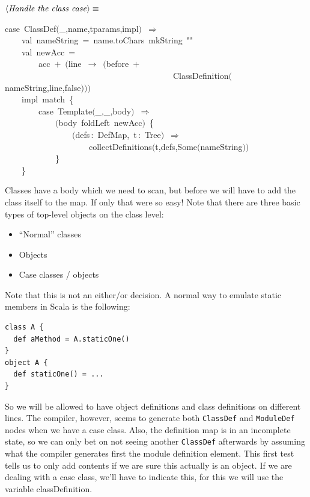 \documentclass[a4paper,12pt]{article}
\begin{document}
$\left<\mbox{\emph{Handle the class case}}\right>\equiv$
\begin{program}{\vem case}~ClassDef$($\_,name,tparams,impl$)$~$\Rightarrow$
\\~~~~{\vem val}~nameString~=~name.toChars~mkString~""
\\~~~~{\vem val}~newAcc~=
\\~~~~~~~~acc~$+$~$($line~$\rightarrow$~$($before~$+$
\\~~~~~~~~~~~~~~~~~~~~~~~~~~~~~~~~~~~~~~~~ClassDefinition$($nameString,line,{\vem false}$)$$)$$)$
\\~~~~impl~{\vem match}~{\small\{}
\\~~~~~~~~{\vem case}~Template$($\_,\_,body$)$~$\Rightarrow$
\\~~~~~~~~~~~~$($body~foldLeft~newAcc$)$~{\small\{}
\\~~~~~~~~~~~~~~~~$($defs\,{\rm :}~DefMap,~t\,{\rm :}~Tree$)$~$\Rightarrow$
\\~~~~~~~~~~~~~~~~~~~~collectDefinitions$($t,defs,Some$($nameString$)$$)$
\\~~~~~~~~~~~~{\small\}}
\\~~~~{\small\}}
\\[0.5em]\end{program}
Classes have a body which we need to scan, but before we will have to add the class
itself to the map. If only that were so easy! Note that there are three basic types
of top-level objects on the class level:

\begin{itemize}
\item ``Normal'' classes
\item Objects
\item Case classes / objects
\end{itemize}

Note that this is not an either/or decision. A normal way to emulate static members in
Scala is the following:

\begin{verbatim}
class A {
  def aMethod = A.staticOne()
}
object A {
  def staticOne() = ...
}
\end{verbatim}

So we will be allowed to have object definitions and class definitions on different
lines. The compiler, however, seems to generate both \texttt{ClassDef} and \texttt{ModuleDef}
nodes when we have a case class. Also, the definition map is in an incomplete state,
so we can only bet on not seeing another \texttt{ClassDef} afterwards by assuming what
the compiler generates first the module definition element.
This first test tells us to only add contents if we are sure this actually is an
object. If we are dealing with a case class, we'll have to indicate this, for this
we will use the variable classDefinition.
\end{document}

